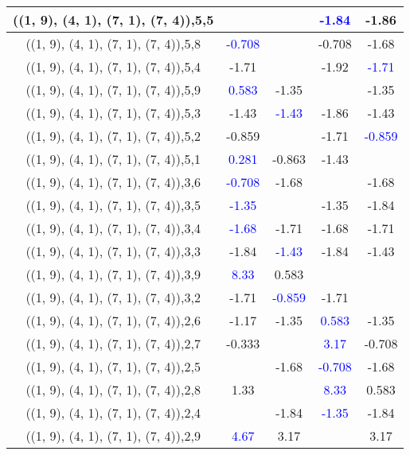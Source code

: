 \documentclass{article}
\begin{document}
\begin{center}
\begin{longtable}{|c|c|c|c|c|}
        	\hline
        	((1, 9), (4, 1), (7, 1), (7, 4)),5,5&&& \textcolor{blue}{-1.84}&-1.86\\
        	\hline
        	((1, 9), (4, 1), (7, 1), (7, 4)),5,8& \textcolor{blue}{-0.708}&&-0.708&-1.68\\
        	\hline
        	((1, 9), (4, 1), (7, 1), (7, 4)),5,4&-1.71&&-1.92& \textcolor{blue}{-1.71}\\
        	\hline
        	((1, 9), (4, 1), (7, 1), (7, 4)),5,9& \textcolor{blue}{0.583}&-1.35&&-1.35\\
        	\hline
        	((1, 9), (4, 1), (7, 1), (7, 4)),5,3&-1.43& \textcolor{blue}{-1.43}&-1.86&-1.43\\
        	\hline
        	((1, 9), (4, 1), (7, 1), (7, 4)),5,2&-0.859&&-1.71& \textcolor{blue}{-0.859}\\
        	\hline
        	((1, 9), (4, 1), (7, 1), (7, 4)),5,1& \textcolor{blue}{0.281}&-0.863&-1.43&\\
        	\hline
        	((1, 9), (4, 1), (7, 1), (7, 4)),3,6& \textcolor{blue}{-0.708}&-1.68&&-1.68\\
        	\hline
        	((1, 9), (4, 1), (7, 1), (7, 4)),3,5& \textcolor{blue}{-1.35}&&-1.35&-1.84\\
        	\hline
        	((1, 9), (4, 1), (7, 1), (7, 4)),3,4& \textcolor{blue}{-1.68}&-1.71&-1.68&-1.71\\
        	\hline
        	((1, 9), (4, 1), (7, 1), (7, 4)),3,3&-1.84& \textcolor{blue}{-1.43}&-1.84&-1.43\\
        	\hline
        	((1, 9), (4, 1), (7, 1), (7, 4)),3,9& \textcolor{blue}{8.33}&0.583&&\\
        	\hline
        	((1, 9), (4, 1), (7, 1), (7, 4)),3,2&-1.71& \textcolor{blue}{-0.859}&-1.71&\\
        	\hline
        	((1, 9), (4, 1), (7, 1), (7, 4)),2,6&-1.17&-1.35& \textcolor{blue}{0.583}&-1.35\\
        	\hline
        	((1, 9), (4, 1), (7, 1), (7, 4)),2,7&-0.333&& \textcolor{blue}{3.17}&-0.708\\
        	\hline
        	((1, 9), (4, 1), (7, 1), (7, 4)),2,5&&-1.68& \textcolor{blue}{-0.708}&-1.68\\
        	\hline
        	((1, 9), (4, 1), (7, 1), (7, 4)),2,8&1.33&& \textcolor{blue}{8.33}&0.583\\
        	\hline
        	((1, 9), (4, 1), (7, 1), (7, 4)),2,4&&-1.84& \textcolor{blue}{-1.35}&-1.84\\
        	\hline
        	((1, 9), (4, 1), (7, 1), (7, 4)),2,9& \textcolor{blue}{4.67}&3.17&&3.17\\

\end{longtable}
\end{center}
\end{document}
